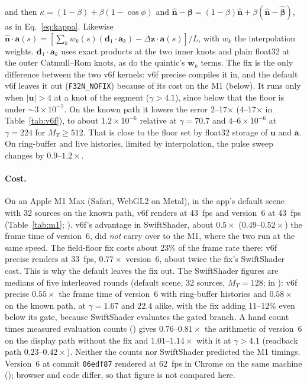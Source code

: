 \documentclass[11pt, a4paper]{article}
\begin{document}
and then $\kappa = (1 - \beta) + \beta(1 - \cos\phi)$ and $\hat{\mathbf{n}} - \boldsymbol{\beta} = (1 - \beta)\hat{\mathbf{n}} + \beta(\hat{\mathbf{n}} - \hat{\boldsymbol{\beta}})$, as in Eq.~\eqref{eq:kappa}. Likewise $\hat{\mathbf{n}}\cdot\mathbf{a}(s) = [\sum_k w_k(s)(\mathbf{d}_1\cdot\mathbf{a}_k) - \Delta\mathbf{z}\cdot\mathbf{a}(s)]/L$, with $w_k$ the interpolation weights. $\mathbf{d}_1\cdot\mathbf{a}_k$ uses exact products at the two inner knots and plain float32 at the outer Catmull--Rom knots, as do the quintic's $\mathbf{w}_k$ terms. The fix is the only difference between the two v6f kernels: v6f precise compiles it in, and the default v6f leaves it out (\texttt{F32N\_NOFIX}) because of its cost on the M1 (below). It runs only when $|\mathbf{u}| > 4$ at a knot of the segment ($\gamma > 4.1$), since below that the floor is under $\sim\!3\times10^{-7}$. On the known path it lowers the error 2--17$\times$ (4--17$\times$ in Table~\ref{tab:v6f}), to about $1.2\times10^{-6}$ relative at $\gamma = 70.7$ and $4$--$6\times10^{-6}$ at $\gamma = 224$ for $M_T \ge 512$. That is close to the floor set by float32 storage of $\mathbf{u}$ and $\mathbf{a}$. On ring-buffer and live histories, limited by interpolation, the pulse sweep changes by $0.9$--$1.2\times$.

\paragraph{Cost.} On an Apple M1 Max (Safari, WebGL2 on Metal), in the app's default scene with 32 sources on the known path, v6f renders at 43~fps and version~6 at 43~fps (Table~\ref{tab:m1}; ). v6f's advantage in SwiftShader, about $0.5\times$ ($0.49$--$0.52\times$) the frame time of version~6, did \emph{not} carry over to the M1, where the two run at the same speed. The field-floor fix costs about 23\% of the frame rate there: v6f precise renders at 33~fps, $0.77\times$ version~6, about twice the fix's SwiftShader cost. This is why the default leaves the fix out. The SwiftShader figures are medians of five interleaved rounds (default scene, 32 sources, $M_T = 128$;  in ): v6f precise $0.55\times$ the frame time of version~6 with ring-buffer histories and $0.58\times$ on the known path, at $\gamma = 1.67$ and $22.4$ alike, with the fix adding 11--12\% even below its gate, because SwiftShader evaluates the gated branch. A hand count times measured evaluation counts () gives $0.76$--$0.81\times$ the arithmetic of version~6 on the display path without the fix and $1.01$--$1.14\times$ with it at $\gamma > 4.1$ (readback path $0.23$--$0.42\times$). Neither the counts nor SwiftShader predicted the M1 timings. Version~6 at commit \texttt{06edf87} rendered at 62~fps in Chrome on the same machine (); browser and code differ, so that figure is not compared here.
\end{document}
